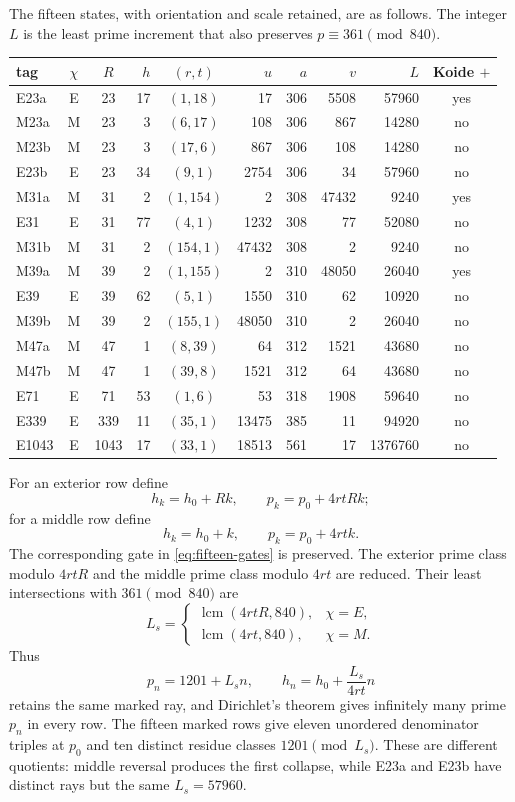 The fifteen states, with orientation and scale retained, are as follows.
The integer $L$ is the least prime increment that also preserves
$p\equiv361\pmod{840}$.
\begin{center}
\scriptsize
\begin{tabular}{@{}lccrcrrrrc@{}}
\toprule
tag&$\chi$&$R$&$h$&$(r,t)$&$u$&$a$&$v$&$L$&Koide $+$\\
\midrule
E23a&E&23&17&$(1,18)$&17&306&5508&57960&yes\\
M23a&M&23&3&$(6,17)$&108&306&867&14280&no\\
M23b&M&23&3&$(17,6)$&867&306&108&14280&no\\
E23b&E&23&34&$(9,1)$&2754&306&34&57960&no\\
M31a&M&31&2&$(1,154)$&2&308&47432&9240&yes\\
E31&E&31&77&$(4,1)$&1232&308&77&52080&no\\
M31b&M&31&2&$(154,1)$&47432&308&2&9240&no\\
M39a&M&39&2&$(1,155)$&2&310&48050&26040&yes\\
E39&E&39&62&$(5,1)$&1550&310&62&10920&no\\
M39b&M&39&2&$(155,1)$&48050&310&2&26040&no\\
M47a&M&47&1&$(8,39)$&64&312&1521&43680&no\\
M47b&M&47&1&$(39,8)$&1521&312&64&43680&no\\
E71&E&71&53&$(1,6)$&53&318&1908&59640&no\\
E339&E&339&11&$(35,1)$&13475&385&11&94920&no\\
E1043&E&1043&17&$(33,1)$&18513&561&17&1376760&no\\
\bottomrule
\end{tabular}
\end{center}

For an exterior row define
\[
 h_k=h_0+Rk,\qquad p_k=p_0+4rtRk;
\]
for a middle row define
\[
 h_k=h_0+k,\qquad p_k=p_0+4rtk.
\]
The corresponding gate in \eqref{eq:fifteen-gates} is preserved.  The
exterior prime class modulo $4rtR$ and the middle prime class modulo $4rt$
are reduced.  Their least intersections with $361\pmod{840}$ are
\begin{equation}
 L_s=
 \begin{cases}
  \operatorname{lcm}(4rtR,840),&\chi=E,\\
  \operatorname{lcm}(4rt,840),&\chi=M.
 \end{cases}
 \label{eq:fifteen-hard-L}
\end{equation}
Thus
\begin{equation}
 p_n=1201+L_sn,\qquad h_n=h_0+\frac{L_s}{4rt}n
 \label{eq:fifteen-hard-family}
\end{equation}
retains the same marked ray, and Dirichlet's theorem gives infinitely many
prime $p_n$ in every row.  The fifteen marked rows give eleven unordered
denominator triples at $p_0$ and ten distinct residue classes
$1201\pmod{L_s}$.  These are different quotients: middle reversal produces
the first collapse, while E23a and E23b have distinct rays but the same
$L_s=57960$.

